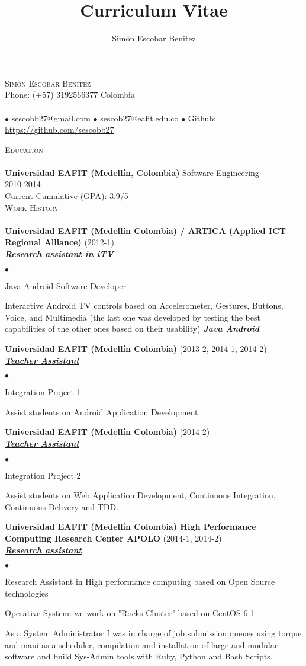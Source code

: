 \documentclass[a4paper]{article}
\title{Curriculum Vitae}
\author{Sim\'on Escobar Benitez}
\newcommand{\lineunder}{\vspace*{-8pt} \\ \hspace*{-18pt} \hrulefill \\}
\newcommand{\header}[1]{{\hspace*{-15pt}\vspace*{6pt}
\textsc{#1}} \vspace*{-6pt} \lineunder}
\newcommand{\employer}[3]{{
\textbf{#1} (#2)\\ \underline{\textbf{\emph{#3}}}\\ }}
\newcommand{\contact}[3]{
\vspace*{-8pt}
\begin{center}
{\LARGE \scshape {#1}}\\ #2 \lineunder #3
\end{center}
\vspace*{-8pt} }
\newenvironment{achievements}{\begin{list}{$\bullet$}{\topsep 0pt \itemsep
-2pt}}{\vspace*{4pt}\end{list}}
\newcommand{\schoolwithcourses}[4]{
\textbf{#1} #2 \\ #3\\ #4\\
\vspace*{5pt} }
\newcommand{\emphasys}[1]{\textbf{\emph{#1}}}
\begin{document}
\small
\smallskip
\vspace*{-44pt}
\contact{Sim\'on Escobar Benitez} { Phone: (+57) 3192566377 Colombia } { $\bullet$ sescobb27@gmail.com $\bullet$ sescob27@eafit.edu.co $\bullet$ Github: \url{https://github.com/sescobb27} }
\header{Education}
\schoolwithcourses{Universidad EAFIT (Medell\'in, Colombia)}{Software Engineering} {2010-2014} {Current Cumulative (GPA): 3.9/5}
\header{Work History}
\employer{ Universidad EAFIT (Medell\'in Colombia) / ARTICA (Applied ICT Regional Alliance)} {2012-1} {Research assistant in iTV}
\begin{achievements}
\item Java Android Software Developer
\item Interactive Android TV controls based on Accelerometer, Gestures, Buttons, Voice, and Multimedia (the last one was developed by testing the best capabilities of the other ones based on their usability) \emphasys{Java Android}
\end{achievements}
\employer{ Universidad EAFIT (Medell\'in Colombia) }{2013-2, 2014-1, 2014-2}{Teacher Assistant}
\begin{achievements}
\item Integration Project 1
\item Assist students on Android Application Development.
\end{achievements}
\employer{ Universidad EAFIT (Medell\'in Colombia) }{2014-2}{Teacher Assistant}
\begin{achievements}
\item Integration Project 2
\item Assist students on Web Application Development, Continuous Integration, Continuous Delivery and TDD.
\end{achievements}
\employer{ Universidad EAFIT (Medell\'in Colombia) High Performance Computing Research Center APOLO}{2014-1, 2014-2}{Research assistant}
\begin{achievements}
\item Research Assistant in High performance computing based on Open Source technologies
\item Operative System: we work on "Rocks Cluster" based on CentOS 6.1
\item As a System Administrator I was in charge of job submission queues using torque and maui as a scheduler, compilation and installation of large and modular software and build Sys-Admin tools with Ruby, Python and Bash Scripts.
\end{achievements}
\end{document}
